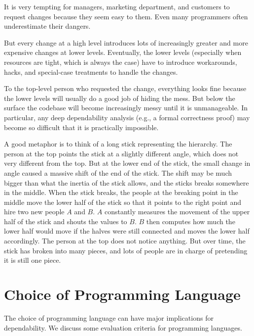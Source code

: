 It is very tempting for managers, marketing department, and customers to request changes because they seem easy to them.
Even many programmers often underestimate their dangers.

But every change at a high level introduces lots of increasingly greater and more expensive changes at lower levels.
Eventually, the lower levels (especially when resources are tight, which is always the case) have to introduce workarounds, hacks, and special-case treatments to handle the changes.

To the top-level person who requested the change, everything looks fine because the lower levels will usually do a good job of hiding the mess.
But below the surface the codebase will become increasingly messy until it is unmanageable.
In particular, any deep dependability analysis (e.g., a formal correctness proof) may become so difficult that it is practically impossible.

A good metaphor is to think of a long stick representing the hierarchy.
The person at the top points the stick at a slightly different angle, which does not very different from the top.
But at the lower end of the stick, the small change in angle caused a massive shift of the end of the stick.
The shift may be much bigger than what the inertia of the stick allows, and the sticks breaks somewhere in the middle.
When the stick breaks, the people at the breaking point in the middle move the lower half of the stick so that it points to the right point and hire two new people $A$ and $B$.
$A$ constantly measures the movement of the upper half of the stick and shouts the values to $B$.
$B$ then computes how much the lower half would move if the halves were still connected and moves the lower half accordingly.
The person at the top does not notice anything.
But over time, the stick has broken into many pieces, and lots of people are in charge of pretending it is still one piece.


\section{Choice of Programming Language}

The choice of programming language can have major implications for dependability.
We discuss some evaluation criteria for programming languages.

